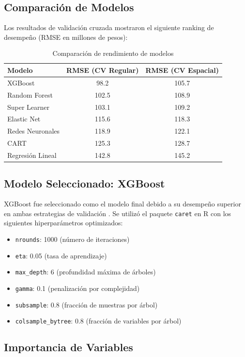 \documentclass[12pt,a4paper,onecolumn]{article}
\begin{document}
\subsection{Comparación de Modelos}

Los resultados de validación cruzada mostraron el siguiente ranking de desempeño (RMSE en millones de pesos):

\begin{table}[H]
\centering
\begin{tabular}{lcc}
\toprule
Modelo & RMSE (CV Regular) & RMSE (CV Espacial) \\
\midrule
XGBoost & 98.2 & 105.7 \\
Random Forest & 102.5 & 108.9 \\
Super Learner & 103.1 & 109.2 \\
Elastic Net & 115.6 & 118.3 \\
Redes Neuronales & 118.9 & 122.1 \\
CART & 125.3 & 128.7 \\
Regresión Lineal & 142.8 & 145.2 \\
\bottomrule
\end{tabular}
\caption{Comparación de rendimiento de modelos}
\end{table}

\subsection{Modelo Seleccionado: XGBoost}

XGBoost fue seleccionado como el modelo final debido a su desempeño superior en ambas estrategias de validación \citep{chen2016xgboost}. Se utilizó el paquete \texttt{caret} en R con los siguientes hiperparámetros optimizados:

\begin{itemize}
\item \texttt{nrounds}: 1000 (número de iteraciones)
\item \texttt{eta}: 0.05 (tasa de aprendizaje)
\item \texttt{max\_depth}: 6 (profundidad máxima de árboles)
\item \texttt{gamma}: 0.1 (penalización por complejidad)
\item \texttt{subsample}: 0.8 (fracción de muestras por árbol)
\item \texttt{colsample\_bytree}: 0.8 (fracción de variables por árbol)
\end{itemize}

\subsection{Importancia de Variables}
\end{document}

